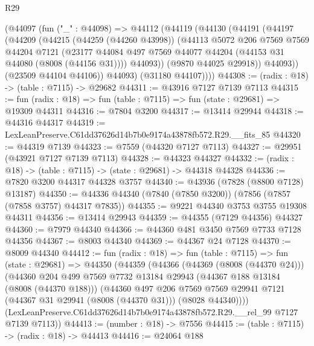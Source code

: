 \begin{lexlean}{R29}
\begin{coremodule}
      (@44097
        (fun ("_" : @44098) =>
        @44112
          (@44119
            (@44130
              (@44191
                (@44197
                  (@44209
                    (@44215
                      (@44259 (@44260 @43998))
                      (@44113
                        @5072
                        @206
                        @7569
                        @7569
                        @44204
                        @7121
                        (@23177
                          @44084
                          @497
                          @7569
                          @44077
                          @44204
                          (@44153 @31 @44080 (@8008 (@44156 @31))))
                        @44093))
                    (@9870 @44025 @29918))
                  @44093))
              (@23509 @44104 @44106))
            @44093)
          (@31180 @44107))))
@44308 := (radix : @18) -> (table : @7115) -> @29682
@44311 := @43916 @7127 @7139 @7113
@44315 := fun (radix : @18) => fun (table : @7115) => fun (state : @29681) => @19309 @44311
@44316 := @7804 @3200
@44317 := @13414 @29944
@44318 := @44316 @44317
@44319 := LexLeanPreserve.C61dd37626d14b7b0e9174a43878fb572.R29.__fits_85
@44320 := @44319 @7139
@44323 := @7559 (@44320 @7127 @7113)
@44327 := @29951 (@43921 @7127 @7139 @7113)
@44328 := @44323 @44327
@44332 := (radix : @18) -> (table : @7115) -> (state : @29681) -> @44318 @44328
@44336 := @7820 @3200 @44317 @44328 @3757
@44340 := @43936 (@7828 (@8800 @7128) @13187)
@44350 := @44336 @44340 (@7840 (@7850 @3200)) (@7856 (@7857 (@7858 @3757) @44317 @7835))
@44355 := @9221 @44340 @3753 @3755 @19308 @44311
@44356 := @13414 @29943
@44359 := @44355 (@7129 @44356) @44327
@44360 := @7979 @44340
@44366 := @44360 @481 @3450 @7569 @7733 @7128 @44356
@44367 := @8003 @44340
@44369 := @44367 @24 @7128
@44370 := @8009 @44340
@44412 := fun (radix : @18) =>
  fun (table : @7115) =>
  fun (state : @29681) =>
  @44350
    (@44359
      (@44366
        (@44369 (@8008 (@44370 @24)))
        (@44360
          @204
          @499
          @7569
          @7732
          @13184
          @29943
          (@44367 @188 @13184 (@8008 (@44370 @188)))
          (@44360
            @497
            @206
            @7569
            @7569
            @29941
            @7121
            (@44367 @31 @29941 (@8008 (@44370 @31)))
            (@8028 @44340))))
      (LexLeanPreserve.C61dd37626d14b7b0e9174a43878fb572.R29.__rel_99 @7127 @7139 @7113))
@44413 := (number : @18) -> @7556
@44415 := (table : @7115) -> (radix : @18) -> @44413
@44416 := @24064 @188

\end{coremodule}
\end{lexlean}
